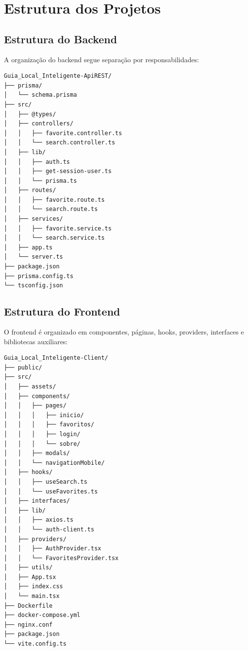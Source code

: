 \documentclass[
    12pt,
    oneside,
    openright,
    a4paper,
    english,
    brazil
]{abntex2}
\begin{document}

\chapter{Estrutura dos Projetos}

\section{Estrutura do Backend}

A organização do backend segue separação por responsabilidades:

\begin{lstlisting}[language=bash, caption={Estrutura resumida do backend}]
Guia_Local_Inteligente-ApiREST/
├── prisma/
│   └── schema.prisma
├── src/
│   ├── @types/
│   ├── controllers/
│   │   ├── favorite.controller.ts
│   │   └── search.controller.ts
│   ├── lib/
│   │   ├── auth.ts
│   │   ├── get-session-user.ts
│   │   └── prisma.ts
│   ├── routes/
│   │   ├── favorite.route.ts
│   │   └── search.route.ts
│   ├── services/
│   │   ├── favorite.service.ts
│   │   └── search.service.ts
│   ├── app.ts
│   └── server.ts
├── package.json
├── prisma.config.ts
└── tsconfig.json
\end{lstlisting}

\section{Estrutura do Frontend}

O frontend é organizado em componentes, páginas, hooks, providers, interfaces e bibliotecas auxiliares:

\begin{lstlisting}[language=bash, caption={Estrutura resumida do frontend}]
Guia_Local_Inteligente-Client/
├── public/
├── src/
│   ├── assets/
│   ├── components/
│   │   ├── pages/
│   │   │   ├── inicio/
│   │   │   ├── favoritos/
│   │   │   ├── login/
│   │   │   └── sobre/
│   │   ├── modals/
│   │   └── navigationMobile/
│   ├── hooks/
│   │   ├── useSearch.ts
│   │   └── useFavorites.ts
│   ├── interfaces/
│   ├── lib/
│   │   ├── axios.ts
│   │   └── auth-client.ts
│   ├── providers/
│   │   ├── AuthProvider.tsx
│   │   └── FavoritesProvider.tsx
│   ├── utils/
│   ├── App.tsx
│   ├── index.css
│   └── main.tsx
├── Dockerfile
├── docker-compose.yml
├── nginx.conf
├── package.json
└── vite.config.ts
\end{lstlisting}
\end{document}
